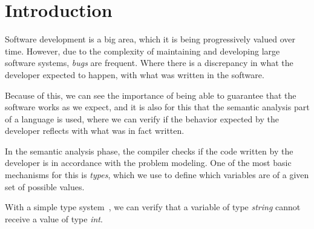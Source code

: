 \documentclass[
       embeddedlogo,
       english,
       lmodern,
       coorientadorbanca,
       noabntexcite
]{ufsc-thesis-rn46-2019}
\theoremstyle{definition}
\begin{document}
\chapter{Introduction}

Software development is a big area, which it is being progressively valued over time.
However, due to the complexity of maintaining and developing large software systems, \textit{bugs} are frequent.
Where there is a discrepancy in what the developer expected to happen, with what was written in the software.

Because of this, we can see the importance of being able to guarantee that the software works as we expect, and it is also for this that the semantic analysis part of a language is used, where we can verify if the behavior expected by the developer reflects with what was in fact written.

In the semantic analysis phase, the compiler checks if the code written by the developer is in accordance with the problem modeling. One of the most basic mechanisms for this is \emph{types}, which we use to define which variables are of a given set of possible values.

With a simple type system~\cite{tapl}, we can verify that a variable of type \emph{string} cannot receive a value of type \emph{int}.
\end{document}
